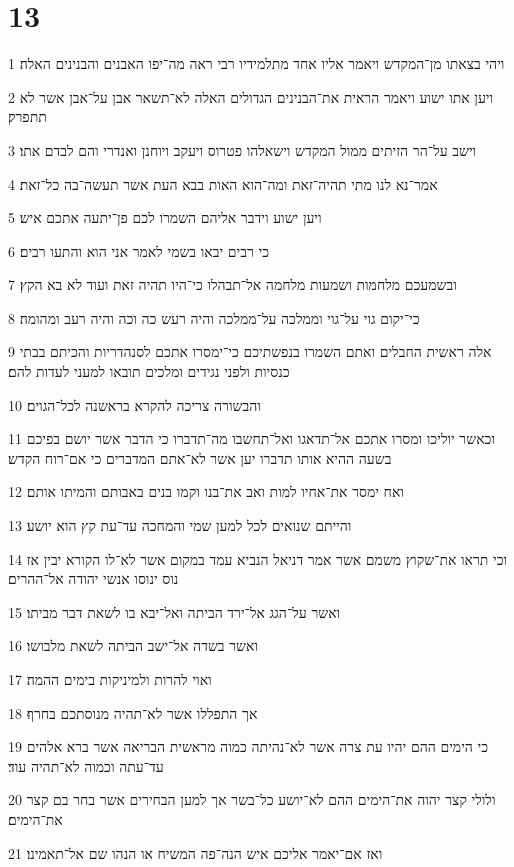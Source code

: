 \chapter{13}

\par 1 ויהי בצאתו מן־המקדש ויאמר אליו אחד מתלמידיו רבי ראה מה־יפו האבנים והבנינים האלה׃
\par 2 ויען אתו ישוע ויאמר הראית את־הבנינים הגדולים האלה לא־תשאר אבן על־אבן אשר לא תתפרק׃
\par 3 וישב על־הר הזיתים ממול המקדש וישאלהו פטרוס ויעקב ויוחנן ואנדרי והם לבדם אתו׃
\par 4 אמר־נא לנו מתי תהיה־זאת ומה־הוא האות בבא העת אשר תעשה־בה כל־זאת׃
\par 5 ויען ישוע וידבר אליהם השמרו לכם פן־יתעה אתכם איש׃
\par 6 כי רבים יבאו בשמי לאמר אני הוא והתעו רבים׃
\par 7 ובשמעכם מלחמות ושמעות מלחמה אל־תבהלו כי־היו תהיה זאת ועוד לא בא הקץ׃
\par 8 כי־יקום גוי על־גוי וממלכה על־ממלכה והיה רעש כה וכה והיה רעב ומהומה׃
\par 9 אלה ראשית החבלים ואתם השמרו בנפשתיכם כי־ימסרו אתכם לסנהדריות והכיתם בבתי כנסיות ולפני נגידים ומלכים תובאו למעני לעדות להם׃
\par 10 והבשורה צריכה להקרא בראשנה לכל־הגוים׃
\par 11 וכאשר יוליכו ומסרו אתכם אל־תדאגו ואל־תחשבו מה־תדברו כי הדבר אשר יושם בפיכם בשעה ההיא אותו תדברו יען אשר לא־אתם המדברים כי אם־רוח הקדש׃
\par 12 ואח ימסר את־אחיו למות ואב את־בנו וקמו בנים באבותם והמיתו אותם׃
\par 13 והייתם שנואים לכל למען שמי והמחכה עד־עת קץ הוא יושע׃
\par 14 וכי תראו את־שקוץ משמם אשר אמר דניאל הנביא עמד במקום אשר לא־לו הקורא יבין אז נוס ינוסו אנשי יהודה אל־ההרים׃
\par 15 ואשר על־הגג אל־ירד הביתה ואל־יבא בו לשאת דבר מביתו׃
\par 16 ואשר בשדה אל־ישב הביתה לשאת מלבושו׃
\par 17 ואוי להרות ולמיניקות בימים ההמה׃
\par 18 אך התפללו אשר לא־תהיה מנוסתכם בחרף׃
\par 19 כי הימים ההם יהיו עת צרה אשר לא־נהיתה כמוה מראשית הבריאה אשר ברא אלהים עד־עתה וכמוה לא־תהיה עוד׃
\par 20 ולולי קצר יהוה את־הימים ההם לא־יושע כל־בשר אך למען הבחירים אשר בחר בם קצר את־הימים׃
\par 21 ואז אם־יאמר אליכם איש הנה־פה המשיח או הנהו שם אל־תאמינו׃
